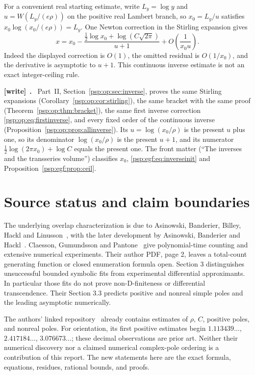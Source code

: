 \documentclass[11pt,letterpaper]{article}
\numberwithin{equation}{section}
\theoremstyle{remark}\newtheorem{remark}[theorem]{Remark}
\newenvironment{writenote}[1][]{\par\smallskip\begingroup\small
 \noindent\textbf{[write]}\if\relax\detokenize{#1}\relax\else~\textbf{#1.}\fi\ }%
 {\par\endgroup\smallskip}
\begin{document}
For a convenient real starting estimate, write $L_y=\log y$ and
$u=W(L_y/(e\rho))$ on the positive real Lambert branch, so
$x_0=L_y/u$ satisfies $x_0\log(x_0/(e\rho))=L_y$.
One Newton correction in the Stirling expansion gives
\begin{equation}\label{psp:egf:eq:inverseinit}
 x=x_0-\frac{\tfrac12\log x_0+\log(C\sqrt{2\pi})}{u+1}
 +O\!\left(\frac1{x_0u}\right).
\end{equation}
Indeed the displayed correction is $O(1)$, the omitted residual is
$O(1/x_0)$, and the derivative is asymptotic to $u+1$.
This continuous inverse estimate is not an exact integer-ceiling rule.
\begin{writenote}
Part~II, Section~\ref{psp:op:sec:inverse}, proves the same Stirling expansions (Corollary~\ref{psp:op:cor:stirling}), the same bracket with the same proof (Theorem~\ref{psp:op:thm:bracket}), the same first inverse correction \eqref{psp:op:eq:firstinverse}, and every fixed order of the continuous inverse (Proposition~\ref{psp:op:prop:allinverse}). Its $u=\log(x_0/\rho)$ is the present $u$ plus one, so its denominator $\log(x_0/\rho)$ is the present $u+1$, and its numerator $\frac12\log(2\pi x_0)+\log C$ equals the present one. The front matter (``The inverses and the transseries volume'') classifies $x_0$, \eqref{psp:egf:eq:inverseinit} and Proposition~\ref{psp:egf:prop:ceil}.
\end{writenote}

\section{Source status and claim boundaries}\label{psp:egf:sec:sources}
The underlying overlap characterization is due to Asinowski, Banderier,
Billey, Hackl and Linusson~\cite{abbhl}, with the later development by
Asinowski, Banderier and Hackl~\cite{abh}. Claesson, Gu\dh mundsson and
Pantone~\cite{cgp} give polynomial-time counting and extensive numerical
experiments. Their author PDF, page 2, leaves a total-count generating
function or closed enumeration formula open. Section 3 distinguishes
unsuccessful bounded symbolic fits from experimental differential
approximants. In particular those fits do not prove non-D-finiteness or
differential transcendence. Their Section 3.3 predicts positive and
nonreal simple poles and the leading asymptotic numerically.

The authors' linked repository~\cite{repo} already contains estimates of
$\rho$, $C$, positive poles, and nonreal poles. For orientation, its first
positive estimates begin $1.113439\ldots$, $2.417184\ldots$,
$3.076673\ldots$; these decimal observations are prior art. Neither their
numerical discovery nor a claimed numerical complex-pole ordering is a
contribution of this report. The new statements here are the exact
formula, equations, residues, rational bounds, and proofs.
\end{document}
